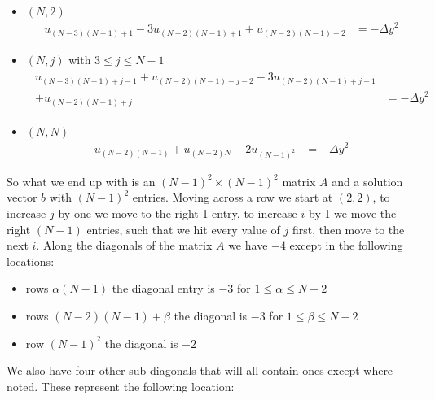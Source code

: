 \documentclass[11pt]{article}
\begin{document}
\begin{itemize}
\begin{align*}
\begin{split}
			\end{split}
		\end{align*}
		\item $ (N,2) $
		\begin{align*}
			u_{(N-3)(N-1)+1} - 3u_{(N-2)(N-1)+1} + u_{(N-2)(N-1)+2} &= -{\Delta y}^2
		\end{align*}
		\item $ (N,j) $ with $ 3\leq j\leq N-1 $
		\begin{align*}
			\begin{split}
				u_{(N-3)(N-1)+j-1} + u_{(N-2)(N-1)+j-2} - 3u_{(N-2)(N-1)+j-1}\\ + u_{(N-2)(N-1)+j} &= -{\Delta y}^2
			\end{split}
		\end{align*}
		\item $ (N,N) $
		\begin{align*}
			u_{(N-2)(N-1)} + u_{(N-2)N} - 2u_{(N-1)^2} &= -{\Delta y}^2
		\end{align*}
	\end{itemize}
	So what we end up with is an $ (N-1)^2\times(N-1)^2 $ matrix $ A $ and a solution vector $ b $ with $ (N-1)^2 $ entries. Moving across a row we start at $ (2,2) $, to increase $ j $ by one we move to the right 1 entry, to increase $ i $ by 1 we move the right $ (N-1) $ entries, such that we hit every value of $ j $ first, then move to the next $ i $.
	\newline\indent Along the diagonals of the matrix $ A $ we have $ -4 $ except in the following locations:
	\begin{itemize}
		\item rows $ \alpha(N-1) $ the diagonal entry is $ -3 $ for $ 1\leq \alpha\leq N-2 $
		\item rows $ \left(N-2\right)\left(N-1\right)+\beta $ the diagonal is $ -3 $ for $ 1\leq\beta\leq N-2 $
		\item row $ \left(N-1\right)^2 $ the diagonal is $ -2 $
	\end{itemize}
	We also have four other sub-diagonals that will all contain ones except where noted. These represent the following location:
\end{document}
